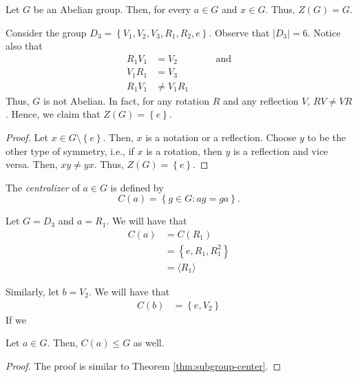 \begin{nexample}
    Let \(G\) be an Abelian group. Then, for every \(a \in G\) and \(x \in G\). Thus, \(Z(G) = G\).
\end{nexample}

\begin{nexample}
    Consider the group \(D_3 = \left\{V_1, V_2, V_3, R_1, R_2, e\right\}\). Observe that \(\left|D_3\right| = 6\). Notice also that
    \[
    \begin{aligned}
        R_1 V_1 &= V_2  &\qquad\text{and}\\
        V_1 R_1 &= V_3 \\
        R_1 V_1 &\neq V_1 R_1
    \end{aligned}
    \]
    Thus, \(G\) is not Abelian. In fact, for any rotation \(R\) and any reflection \(V\), \(RV \neq VR\). Hence, we claim that \(Z(G) = \left\{e\right\}\).

    \begin{proof}
        Let \(x \in G \setminus \left\{e\right\}\). Then, \(x\) is a notation or a reflection. Choose \(y\) to be the other type of symmetry, i.e., if \(x\) is a rotation, then \(y\) is a reflection and vice versa. Then, \(xy \neq yx\). Thus, \(Z(G) = \left\{ e\right\}\).
    \end{proof}
\end{nexample}

\begin{definition}[Centralizer of \(a\) in \(G\)]
    The \textit{centralizer} of \(a \in G\) is defined by
    \[
        C(a) = \left\{g \in G : ag = ga\right\}.
    \]
\end{definition}

\begin{nexample}
    Let \(G = D_3\) and \(a = R_1\). We will have that
    \[
    \begin{aligned}
        C(a) &= C(R_1) \\
             &= \left\{e, R_1, R_1^2\right\} \\
             &= \langle R_1 \rangle
    \end{aligned}
    \]

    Similarly, let \(b = V_2\). We will have that
    \[
    \begin{aligned}
        C(b) &= \left\{e, V_2\right\}
    \end{aligned}
    \]
    If we 
\end{nexample}

\begin{theorem}
    Let \(a \in G\). Then, \(C(a) \leq G\) as well.
\end{theorem}

\begin{proof}
    The proof is similar to Theorem \ref{thm:subgroup-center}.
\end{proof}
